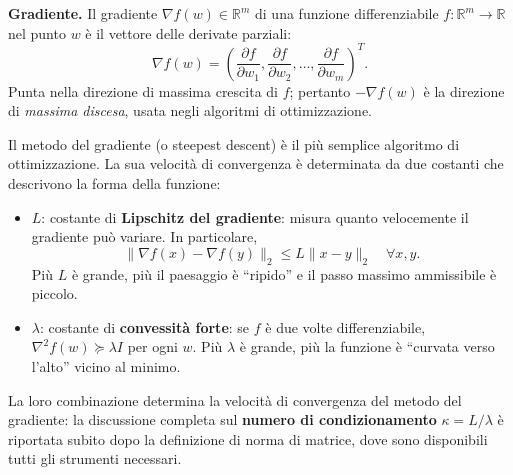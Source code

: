 \documentclass[a4paper,12pt]{article}
\numberwithin{equation}{section}
\numberwithin{figure}{section}
\numberwithin{table}{section}
\newcommand{\R}{\mathbb{R}}
\begin{document}
\begin{definitionbox}
  \textbf{Gradiente.} Il gradiente $\nabla f(w) \in \R^m$ di una funzione differenziabile $f: \R^m \to \R$ nel punto $w$ \`e il vettore delle derivate parziali:
  \[
    \nabla f(w) = \left(\frac{\partial f}{\partial w_1}, \frac{\partial f}{\partial w_2}, \dots, \frac{\partial f}{\partial w_m}\right)^T.
  \]
  Punta nella direzione di massima crescita di $f$; pertanto $-\nabla f(w)$ \`e la direzione di \emph{massima discesa}, usata negli algoritmi di ottimizzazione.
  
  \begin{mnbox}
    Il metodo del gradiente (o steepest descent) è il più semplice algoritmo di ottimizzazione. La sua velocità di convergenza è determinata da due costanti che descrivono la forma della funzione:
    \begin{itemize}
      \item $L$: costante di \textbf{Lipschitz del gradiente}: misura quanto velocemente il gradiente può variare. In particolare,
      \[
        \|\nabla f(x) - \nabla f(y)\|_2 \leq L \|x - y\|_2 \quad \forall x,y.
      \]
      Più $L$ è grande, più il paesaggio è “ripido” e il passo massimo ammissibile è piccolo.
      \item $\lambda$: costante di \textbf{convessità forte}: se $f$ è due volte differenziabile, $\nabla^2 f(w) \succeq \lambda I$ per ogni $w$. Più $\lambda$ è grande, più la funzione è “curvata verso l’alto” vicino al minimo.
    \end{itemize}
    La loro combinazione determina la velocit\`a di convergenza del metodo del
    gradiente: la discussione completa sul \textbf{numero di condizionamento}
    $\kappa = L/\lambda$ \`e riportata subito dopo la definizione di norma di
    matrice, dove sono disponibili tutti gli strumenti necessari.
  \end{mnbox}
\end{definitionbox}
\end{document}
